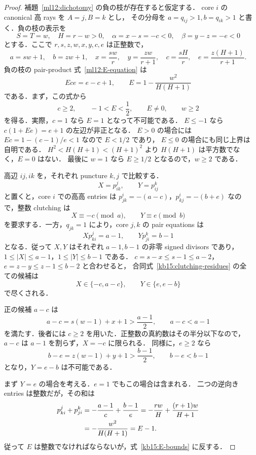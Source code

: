 \begin{proof}
補題~\ref{ml12:dichotomy} の負の枝が存在すると仮定する．
core $i$ の canonical 高 rays を $A=j,B=k$ とし，
その分母を $a=q_{ij}>1,b=q_{ik}>1$ と書く．負の枝の表示を
\[
 S=T=w,\quad H=r-w>0,\quad
 \alpha=x-s=-c<0,\quad \beta=y-z=-e<0
\]
とする．ここで $r,s,z,w,x,y,c,e$ は正整数で，
\[
 a=sw+1,\quad b=zw+1,\quad
 x=\frac{sw}{r},\quad y=\frac{zw}{r+1},\quad
 c=\frac{sH}{r},\quad e=\frac{z(H+1)}{r+1}.
\]
負の枝の pair-product 式~\eqref{ml12:E-equation} は
\begin{equation}\label{kb15:E}
 Ece=e-c+1,\qquad E=1-\frac{w^2}{H(H+1)}
\end{equation}
である．まず，この式から
\begin{equation}\label{kb15:E-bounds}
 c\geq2,\qquad -1<E<\frac12,\qquad E\ne0,\qquad w\geq2
\end{equation}
を得る．実際，$c=1$ なら $E=1$ となって不可能である．
$E\leq-1$ なら $c(1+Ee)=e+1$ の左辺が非正となる．
$E>0$ の場合には $Ec=1-(c-1)/e<1$ なので $E<1/2$ であり，
$E\leq0$ の場合にも同じ上界は自明である．
$H^2<H(H+1)<(H+1)^2$ より $H(H+1)$ は平方数でなく，$E=0$ はない．
最後に $w=1$ なら $E\geq1/2$ となるので，$w\geq2$ である．

高辺 $ij,ik$ を，それぞれ puncture $k,j$ で比較する．
\[
 X=p^j_{ik},\qquad Y=p^k_{ij}
\]
と置くと，core $i$ での高高 entries は
$p^i_{jk}=-(a-c)$，$p^i_{kj}=-(b+e)$ なので，整数 clutching は
\begin{equation}\label{kb15:clutching-residues}
 X\equiv-c\pmod a,\qquad Y\equiv e\pmod b
\end{equation}
を要求する．一方，$q_{jk}=1$ により，core $j,k$ の pair equations は
\[
 Xp^j_{ki}=a-1,\qquad Yp^k_{ji}=b-1
\]
となる．従って $X,Y$ はそれぞれ $a-1,b-1$ の非零 signed divisors であり，
$1\leq|X|\leq a-1$，$1\leq|Y|\leq b-1$ である．
$c=s-x\leq s-1\leq a-2$，$e=z-y\leq z-1\leq b-2$ と合わせると，
合同式~\eqref{kb15:clutching-residues} の全ての候補は
\begin{equation}\label{kb15:two-representatives}
 X\in\{-c,a-c\},\qquad Y\in\{e,e-b\}
\end{equation}
で尽くされる．

正の候補 $a-c$ は
\[
 a-c=s(w-1)+x+1>\frac{a-1}{2},\qquad a-c<a-1
\]
を満たす．後者には $c\geq2$ を用いた．正整数の真約数はその半分以下なので，
$a-c$ は $a-1$ を割らず，$X=-c$ に限られる．
同様に，$e\geq2$ なら
\[
 b-e=z(w-1)+y+1>\frac{b-1}{2},\qquad b-e<b-1
\]
となり，$Y=e-b$ は不可能である．

まず $Y=e$ の場合を考える．$e=1$ でもこの場合は含まれる．
二つの逆向き entries は整数だが，その和は
\begin{align}
 p^j_{ki}+p^k_{ji}
 &= -\frac{a-1}{c}+\frac{b-1}{e}
 =-\frac{rw}{H}+\frac{(r+1)w}{H+1}\notag\\
 &=-\frac{w^2}{H(H+1)}=E-1.
 \label{kb15:reverse-sum}
\end{align}
従って $E$ は整数でなければならないが，式~\eqref{kb15:E-bounds} に反する．


\end{proof}
